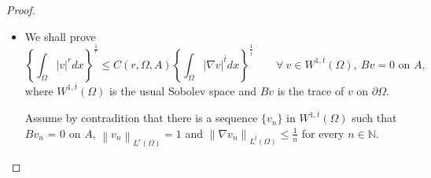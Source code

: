 \documentclass[11pt, a4paper]{article}
\numberwithin{equation}{section}
\newcommand{\leb}[1]{\mathop \le \limits_{(#1)}}
\newcommand{\NN}{{\mathbb N}}
\newcommand{\norm}[1]{\left\lVert #1\right\rVert}
\begin{document}
\begin{proof}
\begin{itemize}[wide]
    Put
 \[ X= \bigcup_{w\in \overline{\Sigma}_{N-1}} \{x+sw: s \in (0,r_{w})\}.\]  
  Then $X$ is open subset of $\Omega$. Thus we can use the polar coordinate with the pole at $x$ and get   
  \begin{align}
    \label{a11b}
    \begin{split}
      |u(x)|
      &=\frac{1}{\sigma(\overline{\Sigma}_{N-1})}\int_{\overline{\Sigma}_{N-1}}|u(x)|d\omega\\
      &\leb{\eqref{az11}}\frac{1}{\sigma(\overline{\Sigma}_{N-1})}\int_{\overline{\Sigma}_{N-1}}\int_{0}^{r_{\omega}}\frac{|\nabla u(x+\xi\omega)|\xi^{N-1}}{|x+\xi\omega -x|^{N-1}}d\xi d\omega\\  &=\frac{1}{\sigma(\overline{\Sigma}_{N-1})}\int_{X}\frac{|\nabla
        u(y)|}{|y -x|^{N-1}}dy\\ &\le\frac{1}{\sigma(\overline{\Sigma}_{N-1})}\int_{\Omega}\frac{|\nabla
        u(y)|}{|y -x|^{N-1}}dy.
    \end{split}
\end{align}
Arguing as in the proof of $(i)$, we get \eqref{ineq}.

\item[$(iii)$]  We shall prove
  \begin{equation}
    \left\{\int_{\Omega} |v|^{r}dx\right\}^{\frac{1}{r}}\le
    C(r,\Omega,A)\left\{\int_{\Omega} |\nabla
      v|^{\bar{t}}dx\right\}^{\frac{1}{\bar{t}}}\qquad\forall ~v \in
    W^{1,\bar{t}}(\Omega),~ Bv=0 \text{ on } A,
\label{ineqb}
\end{equation}   
where $W^{1,\bar{t}}(\Omega)$ is the usual Sobolev space and $Bv$ is the
trace of $v$ on $\partial\Omega$.

 Assume by contradition that there is a sequence $\{v_{n}\}$ in
 $W^{1,\bar{t}}(\Omega)$ such that $Bv_{n}$ = 0 on $A$,
 $\norm{v_{n}}_{L^{r}(\Omega)}=1$ and $\norm{\nabla
 v_{n}}_{L^{\bar{t}}(\Omega)}\le \frac{1}{n}$ for every $n\in \NN$.
 

\end{itemize}
\end{proof}
\end{document}
